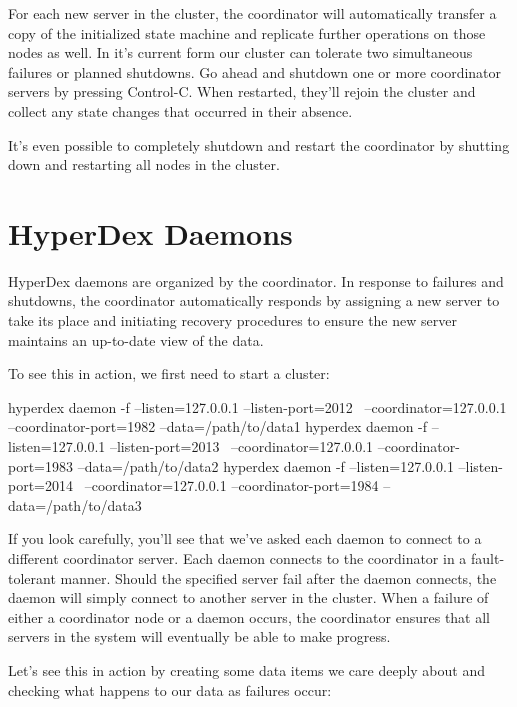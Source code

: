 For each new server in the cluster, the coordinator will automatically transfer
a copy of the initialized state machine and replicate further operations on
those nodes as well.  In it's current form our cluster can tolerate two
simultaneous failures or planned shutdowns.  Go ahead and shutdown one or more
coordinator servers by pressing Control-C.  When restarted, they'll rejoin the
cluster and collect any state changes that occurred in their absence.

It's even possible to completely shutdown and restart the coordinator by
shutting down and restarting all nodes in the cluster.

\section{HyperDex Daemons}
\label{chap:fault-tolerance:daemons}

HyperDex daemons are organized by the coordinator.  In response to failures and
shutdowns, the coordinator automatically responds by assigning a new server to
take its place and initiating recovery procedures to ensure the new server
maintains an up-to-date view of the data.

To see this in action, we first need to start a cluster:

\begin{consolecode}
hyperdex daemon -f --listen=127.0.0.1 --listen-port=2012 \
                   --coordinator=127.0.0.1 --coordinator-port=1982 --data=/path/to/data1
hyperdex daemon -f --listen=127.0.0.1 --listen-port=2013 \
                   --coordinator=127.0.0.1 --coordinator-port=1983 --data=/path/to/data2
hyperdex daemon -f --listen=127.0.0.1 --listen-port=2014 \
                   --coordinator=127.0.0.1 --coordinator-port=1984 --data=/path/to/data3
\end{consolecode}

If you look carefully, you'll see that we've asked each daemon to connect to a
different coordinator server.  Each daemon connects to the coordinator in a
fault-tolerant manner.  Should the specified server fail after the daemon
connects, the daemon will simply connect to another server in the cluster.  When
a failure of either a coordinator node or a daemon occurs, the coordinator
ensures that all servers in the system will eventually be able to make progress.

Let's see this in action by creating some data items we care deeply about and
checking what happens to our data as failures occur:

